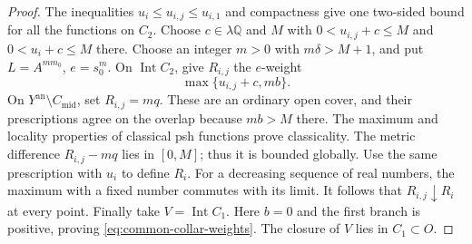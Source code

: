 \documentclass[11pt,reqno]{amsart}
\theoremstyle{definition}
\theoremstyle{remark}
\numberwithin{equation}{section}
\newcommand{\an}{\mathrm{an}}
\begin{document}
\begin{proof}
The inequalities \(u_i\le u_{i,j}\le u_{i,1}\) and compactness give
one two-sided bound for all the functions on \(C_2\).
Choose \(c\in\lambda\mathbb Q\) and \(M\) with
\(0<u_{i,j}+c\le M\) and \(0<u_i+c\le M\) there.
Choose an integer \(m>0\) with \(m\delta>M+1\), and put
\(L=A^{mm_0}\), \(e=s_0^m\).
On \(\operatorname{Int}C_2\), give \(R_{i,j}\) the \(e\)-weight
\[
 \max\{u_{i,j}+c,mb\}.
\]
On \(Y^{\an}\setminus C_{\mathrm{mid}}\), set \(R_{i,j}=mq\).
These are an ordinary open cover, and their prescriptions agree on
the overlap because \(mb>M\) there.
The maximum and locality properties of classical psh functions
\cite[Proposition~4.2]{GR} prove classicality.
The metric difference \(R_{i,j}-mq\) lies in \([0,M]\);
thus it is bounded globally.
Use the same prescription with \(u_i\) to define \(R_i\).
For a decreasing sequence of real numbers,
the maximum with a fixed number commutes with its limit.
It follows that \(R_{i,j}\downarrow R_i\) at every point.
Finally take \(V=\operatorname{Int}C_1\). Here \(b=0\) and the
first branch is positive, proving \eqref{eq:common-collar-weights}.
The closure of \(V\) lies in \(C_1\subset O\).
\end{proof}
\end{document}
